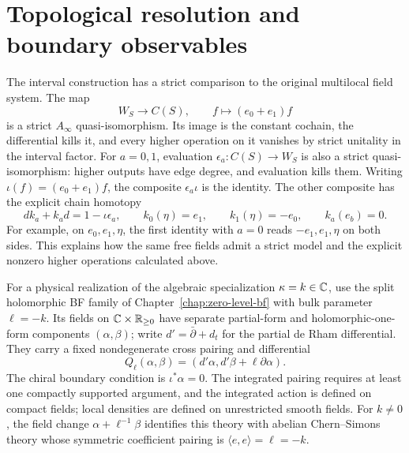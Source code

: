\clearpage
\section{Topological resolution and boundary observables}

The interval construction has a strict comparison to the original
multilocal field system.  The map
\[
 W_S\longrightarrow C(S),\qquad f\longmapsto(e_0+e_1)f
\]
is a strict $A_\infty$ quasi-isomorphism.  Its image is the constant
cochain, the differential kills it, and every higher operation on it
vanishes by strict unitality in the interval factor.  For $a=0,1$, evaluation $\epsilon_a:C(S)\to W_S$ is also a strict
quasi-isomorphism: higher outputs have edge degree, and evaluation kills them.
Writing $\iota(f)=(e_0+e_1)f$, the composite $\epsilon_a\iota$ is the
identity.  The other composite has the explicit chain homotopy
\[
 dk_a+k_ad=1-\iota\epsilon_a,\qquad
 k_0(\eta)=e_1,\qquad k_1(\eta)=-e_0,\qquad k_a(e_b)=0.
\]
For example, on $e_0,e_1,\eta$, the first identity with $a=0$
reads $-e_1,e_1,\eta$ on both sides.  This explains
how the same free fields admit a strict model and the explicit nonzero
higher operations calculated above.

For a physical realization of the algebraic specialization
$\kappa=k\in\mathbb C$, use the split holomorphic BF family of
Chapter~\ref{chap:zero-level-bf} with bulk parameter $\ell=-k$.
Its fields on $\mathbb C\times\mathbb R_{\ge0}$ have separate partial-form and
holomorphic-one-form components $(\alpha,\beta)$; write
$d'=\bar\partial+d_t$ for the partial de Rham differential.
They carry a fixed
nondegenerate cross pairing and differential
\[
 Q_\ell(\alpha,\beta)=(d'\alpha,d'\beta+\ell\partial\alpha).
\]
The chiral boundary condition is $\iota^*\alpha=0$.  The integrated
pairing requires at least one compactly supported argument, and the
integrated action is defined on compact fields; local densities are
defined on unrestricted smooth fields.
For $k\ne0$, the field change
$\alpha+\ell^{-1}\beta$ identifies this theory with abelian
Chern--Simons theory whose symmetric coefficient pairing is
$\langle e,e\rangle=\ell=-k$.

